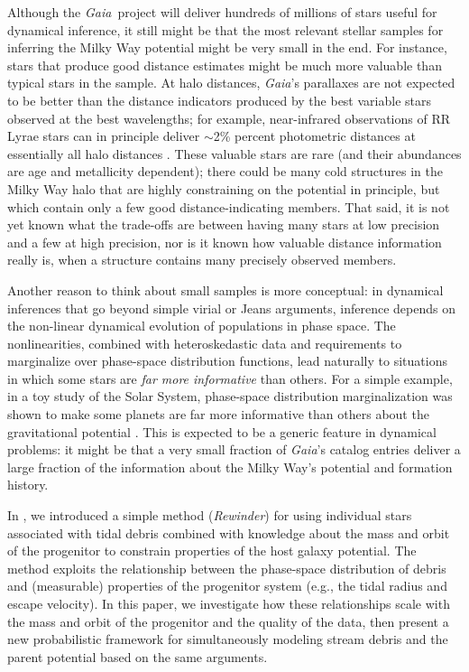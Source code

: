 \documentclass[letterpaper,12pt,preprint]{aastex}
\newcommand{\project}[1]{\textsl{#1}}
\newcommand{\gaia}{\project{Gaia}}
\newcommand{\paperone}{Paper 1}
\begin{document}
Although the \gaia\, project will deliver hundreds of millions of stars useful for dynamical inference,
  it still might be that the most relevant stellar samples for inferring the Milky Way potential might be very small in the end.
For instance, stars that produce good distance estimates might be much more valuable than typical stars in the sample.
At halo distances, \gaia's parallaxes are not expected to be better than the distance indicators produced by the best
  variable stars observed at the best wavelengths; for example, near-infrared observations of RR Lyrae stars
  can in principle deliver $\sim$2\% percent photometric distances at essentially all halo distances \citep{madore12}.
These valuable stars are rare (and their abundances are age and metallicity dependent);
  there could be many cold structures in the Milky Way halo that are highly constraining
  on the potential in principle, but which contain only a few good distance-indicating members.
That said, it is not yet known what the trade-offs are between having many stars at low precision and a few at high precision,
  nor is it known how valuable distance information really is, when a structure contains many precisely observed members.

Another reason to think about small samples is more conceptual:
in dynamical inferences that go beyond simple virial or Jeans arguments,
  inference depends on the non-linear dynamical evolution of populations in phase space.
The nonlinearities, combined with heteroskedastic data and requirements to marginalize over phase-space distribution functions,
  lead naturally to situations in which some stars are \emph{far more informative} than others.
For a simple example, in a toy study of the Solar System,
  phase-space distribution marginalization was shown to make some planets are far more informative than others
  about the gravitational potential \citep{bovy10}.
This is expected to be a generic feature in dynamical problems:
  it might be that a very small fraction of \gaia's catalog entries
  deliver a large fraction of the information about the Milky Way's potential and formation history.

In \citet[][hereafter \paperone]{apw13}, we introduced a simple method (\emph{Rewinder}) for using individual stars associated with tidal debris combined with knowledge about the mass and orbit of the progenitor to constrain properties of the host galaxy potential. The method exploits the relationship between the phase-space distribution of debris and (measurable) properties of the progenitor system (e.g., the tidal radius and escape velocity). In this paper, we investigate how these relationships scale with the mass and orbit of the progenitor and the quality of the data, then present a new probabilistic framework for simultaneously modeling stream debris and the parent potential based on the same arguments.
\end{document}
